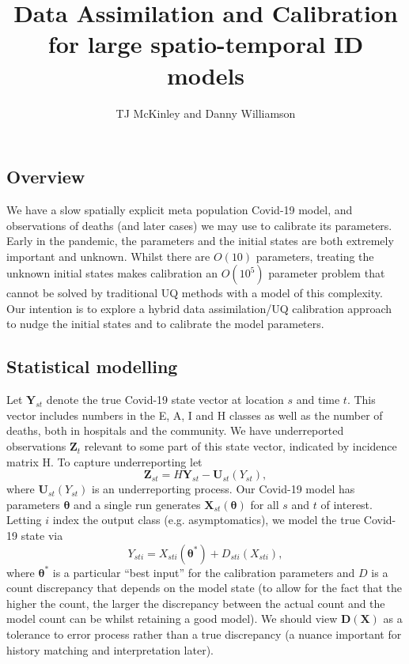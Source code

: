 \documentclass[a4paper]{article}
\title{Data Assimilation and Calibration for large spatio-temporal ID models}
\author{TJ McKinley and Danny Williamson}
\date{}
\newcommand{\btheta}{\bm{\theta}}
\newcommand{\bX}{\bm{X}}
\newcommand{\bY}{\bm{Y}}
\newcommand{\bZ}{\bm{Z}}
\newcommand{\bU}{\bm{U}}
\newcommand{\bD}{\bm{D}}
\begin{document}
\maketitle

\subsection*{Overview}
We have a slow spatially explicit meta population Covid-19 model, and observations of deaths (and later cases) we may use to calibrate its parameters. Early in the pandemic, the parameters and the initial states are both extremely important and unknown. Whilst there are $O(10)$ parameters, treating the unknown initial states makes calibration an $O(10^5)$ parameter problem that cannot be solved by traditional UQ methods with a model of this complexity. Our intention is to explore a hybrid data assimilation/UQ calibration approach to nudge the initial states and to calibrate the model parameters.

\subsection*{Statistical modelling}
Let $\bY_{st}$ denote the true Covid-19 state vector at location $s$ and time $t$. This vector includes numbers in the E, A, I and H classes as well as the number of deaths, both in hospitals and the community. We have underreported observations $\bZ_t$ relevant to some part of this state vector, indicated by incidence matrix H. To capture underreporting let 
\begin{equation}\label{obs}
\bZ_{st} = H\bY_{st} - \bU_{st}(Y_{st}),
\end{equation}
where $\bU_{st}(Y_{st})$ is an underreporting process. Our Covid-19 model has parameters $\btheta$ and a single run generates $\bX_{st}(\btheta)$ for all $s$ and $t$ of interest. Letting $i$ index the output class (e.g. asymptomatics), we model the true Covid-19 state via
\begin{equation}\label{best}
Y_{sti} = X_{sti}(\btheta^*) + D_{sti}(X_{sti}),
\end{equation}
where $\btheta^*$ is a particular ``best input'' for the calibration parameters and $D$ is a count discrepancy that depends on the model state (to allow for the fact that the higher the count, the larger the discrepancy between the actual count and the model count can be whilst retaining a good model). We should view $\bD(\bX)$ as a tolerance to error process rather than a true discrepancy (a nuance important for history matching and interpretation later).
\end{document}
